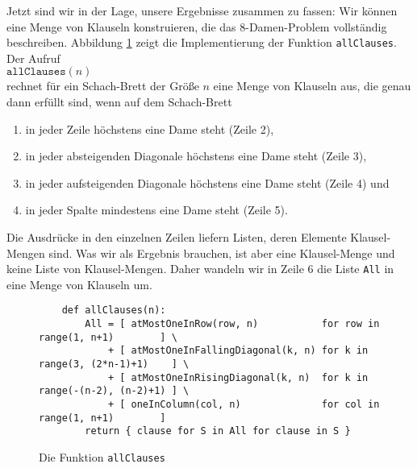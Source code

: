 Jetzt sind wir in der Lage, unsere Ergebnisse zusammen zu fassen:  Wir können eine
Menge von Klauseln konstruieren, die das 8-Damen-Problem vollständig beschreiben.
Abbildung \ref{fig:allClauses} zeigt die Implementierung der Funktion \texttt{allClauses}.
Der Aufruf \\[0.2cm]
\hspace*{1.3cm} $\texttt{allClauses}(n)$ \\[0.2cm]
rechnet für ein Schach-Brett der Größe $n$ eine Menge von Klauseln aus, die
genau dann erfüllt sind, wenn auf dem Schach-Brett
\begin{enumerate}
\item in jeder Zeile höchstens eine Dame steht (Zeile 2),
\item in jeder absteigenden Diagonale höchstens eine Dame steht (Zeile 3),
\item in jeder aufsteigenden Diagonale höchstens eine Dame steht (Zeile 4) und
\item in jeder Spalte mindestens eine Dame steht (Zeile 5).
\end{enumerate}
Die Ausdrücke in den einzelnen Zeilen liefern Listen, deren Elemente
Klausel-Mengen sind.  Was wir als Ergebnis brauchen, ist aber eine Klausel-Menge
und keine Liste von Klausel-Mengen.  Daher wandeln wir in Zeile 6 die Liste \texttt{All} in eine Menge von
Klauseln um.


\begin{figure}[!ht]
  \centering
\begin{verbatim}
    def allClauses(n):
        All = [ atMostOneInRow(row, n)           for row in range(1, n+1)        ] \
            + [ atMostOneInFallingDiagonal(k, n) for k in range(3, (2*n-1)+1)    ] \
            + [ atMostOneInRisingDiagonal(k, n)  for k in range(-(n-2), (n-2)+1) ] \
            + [ oneInColumn(col, n)              for col in range(1, n+1)        ]
        return { clause for S in All for clause in S }
\end{verbatim}
\vspace*{-0.3cm}
  \caption{Die Funktion \texttt{allClauses}}
  \label{fig:allClauses}
\end{figure}

